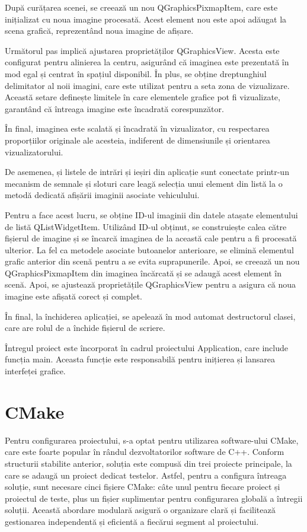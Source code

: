 \documentclass[a4paper,12pt]{report}
\begin{document}
După curățarea scenei, se creează un nou QGraphicsPixmapItem, care este inițializat cu noua imagine procesată. Acest element nou este apoi adăugat la scena grafică, reprezentând noua imagine de afișare.

Următorul pas implică ajustarea proprietăților QGraphicsView. Acesta este configurat pentru alinierea la centru, asigurând că imaginea este prezentată în mod egal și centrat în spațiul disponibil. În plus, se obține dreptunghiul delimitator al noii imagini, care este utilizat pentru a seta zona de vizualizare. Această setare definește limitele în care elementele grafice pot fi vizualizate, garantând că întreaga imagine este încadrată corespunzător.

În final, imaginea este scalată și încadrată în vizualizator, cu respectarea proporțiilor originale ale acesteia, indiferent de dimensiunile și orientarea vizualizatorului.

De asemenea, și listele de intrări și ieșiri din aplicație sunt conectate printr-un mecanism de semnale și sloturi care leagă selecția unui element din listă la o metodă dedicată afișării imaginii asociate vehiculului.

Pentru a face acest lucru, se obține ID-ul imaginii din datele atașate elementului de listă QListWidgetItem. Utilizând ID-ul obținut, se construiește calea către fișierul de imagine și se încarcă imaginea de la această cale pentru a fi procesată ulterior. La fel ca metodele asociate butoanelor anterioare, se elimină elementul grafic anterior din scenă pentru a se evita suprapunerile. Apoi, se creează un nou QGraphicsPixmapItem din imaginea încărcată și se adaugă acest element în scenă. Apoi, se ajustează proprietățile QGraphicsView pentru a asigura că noua imagine este afișată corect și complet.

În final, la închiderea aplicației, se apelează în mod automat destructorul clasei, care are rolul de a închide fișierul de scriere.

Întregul proiect este încorporat în cadrul proiectului Application, care include funcția main. Aceasta funcție este responsabilă pentru inițierea și lansarea interfeței grafice.

\section{CMake}
Pentru configurarea proiectului, s-a optat pentru utilizarea software-ului CMake, care este foarte popular în rândul dezvoltatorilor software de C++. Conform structurii stabilite anterior, soluția este compusă din trei proiecte principale, la care se adaugă un proiect dedicat testelor. Astfel, pentru a configura întreaga soluție, sunt necesare cinci fișiere CMake: câte unul pentru fiecare proiect și proiectul de teste, plus un fișier suplimentar pentru configurarea globală a întregii soluții. Această abordare modulară asigură o organizare clară și facilitează gestionarea independentă și eficientă a fiecărui segment al proiectului.
\end{document}
